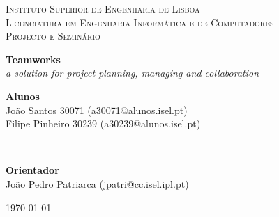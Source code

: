 \documentclass[pdftex,fontsize=20pt,a4paper]{scrbook}
\begin{document}
\begin{titlepage}
\begin{center}
\begin{minipage}{0.8\textwidth}
\begin{center}
\textsc{\scriptsize Instituto Superior de Engenharia de Lisboa}\\
\textsc{\footnotesize Licenciatura em Engenharia Informática e de Computadores }\\[1cm]
\textsc{\footnotesize Projecto e Seminário}\\
\vspace*{1cm}
\end{center}
\end{minipage}
{ \huge\bfseries Teamworks }\\[1cm]
{ \emph{a solution for project planning, managing and collaboration} }\\[4cm]
\begin{minipage}{1\textwidth}
\begin{center}
\textbf{\small{Alunos}}\\
\footnotesize
João Santos 30071 (a30071@alunos.isel.pt) \\
Filipe Pinheiro 30239 (a30239@alunos.isel.pt)
\end{center}
\end{minipage}\\[0.5cm]
\begin{minipage}{1\textwidth}
\begin{center}
\textbf{\small{Orientador}}\\
\footnotesize
João Pedro Patriarca (jpatri@cc.isel.ipl.pt)
\end{center}
\end{minipage}
\vfill
{\footnotesize \today}
\end{center}
\end{titlepage}
\clearpage
\end{document}
